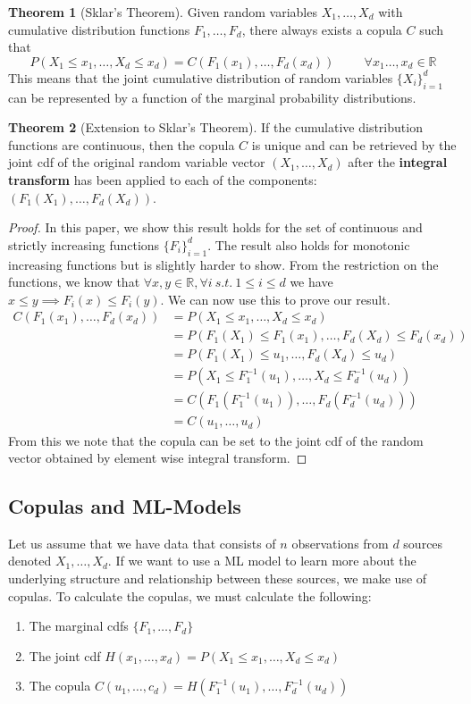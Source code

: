 \documentclass[12pt]{article}
\def\inv{^{-1}}
\newcommand{\ds}{\displaystyle}
\theoremstyle{definition}
\newtheorem{theorem}{Theorem}
\theoremstyle{definition}
\begin{document}
\noindent \begin{theorem}[Sklar's Theorem] Given random variables $X_1,\hdots,X_d$ with cumulative distribution functions $F_1,\hdots,F_d$, there always exists a copula $C$ such that 
$$P(X_1\leq x_1, \hdots, X_d\leq x_d)=C( F_1(x_1),\hdots ,F_d(x_d))\hspace{1cm}\forall x_1\hdots,x_d\in\mathbb{R}$$
This means that the joint cumulative distribution of random variables $\ds \{X_i\}_{i=1}^d $ can be represented by a function of the marginal probability distributions.
\end{theorem}
\begin{theorem}[Extension to Sklar's Theorem]
If the cumulative distribution functions are continuous, then the copula $C$ is unique and can be retrieved by the joint cdf of the original random variable vector $(X_1,\hdots,X_d)$ after the \textbf{integral transform} has been applied to each of the components: $(F_1(X_1),\hdots,F_d(X_d))$.
\begin{proof}
In this paper, we show this result holds for the set of continuous and strictly increasing functions $\ds \{F_i\}_{i=1}^d$. The result also holds for monotonic increasing functions but is slightly harder to show.
From the restriction on the functions, we know that $\forall x,y \in \mathbb{R} ,\forall i\ s.t.\ 1\leq i\leq d$ we have $x\leq y\implies F_i(x)\leq F_i(y)$. We can now use this to prove our result. 
\begin{align*}
    C( F_1(x_1),\hdots ,F_d(x_d))&=P(X_1\leq x_1,\hdots, X_d\leq x_d)\\
    &=P(F_1(X_1)\leq F_1(x_1),\hdots,F_d(X_d)\leq F_d(x_d))\\
    &=P(F_1(X_1)\leq u_1,\hdots,F_d(X_d)\leq u_d)\\
    &=P(X_1\leq F_1^{-1}(u_1),\hdots,X_d\leq F_d^{-1}(u_d))\\
    &=C(F_1(F_1^{-1}(u_1)),\hdots,F_d(F_d^{-1}(u_d)))\\
    &=C(u_1,\hdots,u_d)
\end{align*}
From this we note that the copula can be set to the joint cdf of the random vector obtained by element wise integral transform.
\end{proof}

\end{theorem}


\subsection{Copulas and ML-Models}
Let us assume that we have data that consists of  $n$ observations from $d$ sources denoted $X_1,\hdots, X_d$. If we want to use a ML model to learn more about the underlying structure and relationship between these sources, we make use of copulas. To calculate the copulas, we must calculate the following:
\begin{enumerate}
    \item The marginal cdfs $\ds\{F_1, \hdots, F_d\}$ \item The joint cdf $H(x_1,\hdots,x_d)=P(X_1\leq x_1, \hdots, X_d\leq x_d)$
    \item The copula $C(u_1,\hdots,c_d)=H(F\inv_1(u_1),\hdots,F\inv_d(u_d))$
\end{enumerate}
\end{document}
